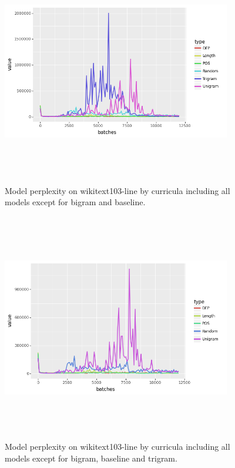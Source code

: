 \documentclass [11pt, proquest] {uwthesis}[2020/12/20]
\begin{document}
\begin{figure}[h]
\centering
\label{fig:wikitext-103-sentence}
\includegraphics[width=10cm, height=10cm]{Thesis/images/wikitext-103lineminusbigrambaseline.png}
\caption{Model perplexity on wikitext103-line by curricula including all models except for bigram and baseline.}
\end{figure}
\begin{figure}[h]
\centering
\label{fig:wikitext-103-sentence}
\includegraphics[width=10cm, height=10cm]{Thesis/images/wikitext-103lineminusbigrambaselinetrigram.png}
\caption{Model perplexity on wikitext103-line by curricula including all models except for bigram, baseline and trigram.}
\end{figure}
\end{document}

